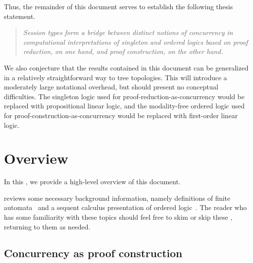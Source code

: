 Thus, the remainder of this document serves to establish the following thesis statement.
\begin{quotation}
  \normalsize
  \itshape Session types form a bridge between distinct notions of concurrency in computational interpretations of singleton and ordered logics based on proof reduction, on one hand, and proof construction, on the other hand.
\end{quotation}

We also conjecture that the results contained in this document can be generalized in a relatively straightforward way to tree topologies.
This will introduce a moderately large notational overhead, but should present no conceptual difficulties.
The singleton logic used for proof-reduction-as-concurrency would be replaced with propositional linear logic, and the modality-free ordered logic used for proof-construction-as-concurrency would be replaced with first-order linear logic.

\section{Overview}\label{sec:introduction:overview}

In this , we provide a high-level overview of this document.

 reviews some necessary background information, namely definitions of finite automata~ and a sequent calculus presentation of ordered logic\autocite{Polakow+Pfenning:MFPS99}~.
The reader who has some familiarity with these topics should feel free to skim or skip these , returning to them as needed.

\subsection{Concurrency as proof construction}

